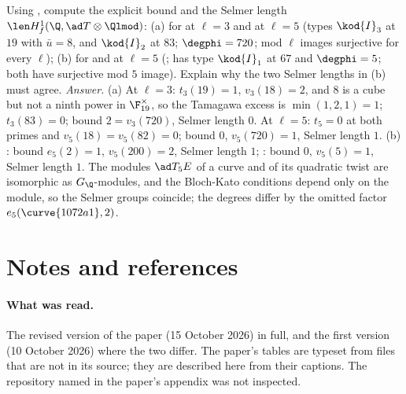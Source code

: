 \begin{sloppypar}
\begin{exercise}\label{ex:paper:selmer-examples}
Using , compute the explicit bound and the Selmer length $\len H^1_f(\Q,\ad T\otimes\Qlmod)$: (a) for  at $\ell=3$ and at $\ell=5$ (types $\kod{I}_3$ at $19$ with
$\bar u=8$, and $\kod{I}_2$ at $83$; $\degphi=720$; mod $\ell$ images surjective for every $\ell$); (b) for  and  at $\ell=5$ (;  has type
$\kod{I}_1$ at $67$ and $\degphi=5$; both have surjective mod $5$ image). Explain why the two Selmer lengths in (b) must agree.
\emph{Answer.} (a) At $\ell=3$: $t_3(19)=1$, $v_3(18)=2$, and $8$ is a cube but not a ninth power in $\F_{19}^\times$, so the Tamagawa excess is $\min(1,2,1)=1$; $t_3(83)=0$; bound $2=v_3(720)$,
Selmer length $0$. At $\ell=5$: $t_5=0$ at both primes and $v_5(18)=v_5(82)=0$; bound $0$, $v_5(720)=1$, Selmer length $1$. (b) : bound $e_5(2)=1$, $v_5(200)=2$, Selmer length $1$;
: bound $0$, $v_5(5)=1$, Selmer length $1$. The modules $\ad T_5E$ of a curve and of its quadratic twist are isomorphic as $G_\Q$-modules, and the Bloch-Kato conditions depend only on
the module, so the Selmer groups coincide; the degrees differ by the omitted factor $e_5(\curve{1072a1},2)$.
\end{exercise}

\section{Notes and references}\label{sec:paper:notes}

\paragraph{What was read.} The revised version of the paper (15 October 2026) in full, and the first version (10 October 2026) where the two differ. The paper's tables are typeset from
files that are not in its source; they are described here from their captions. The repository named in the paper's appendix was not inspected.


\end{sloppypar}
